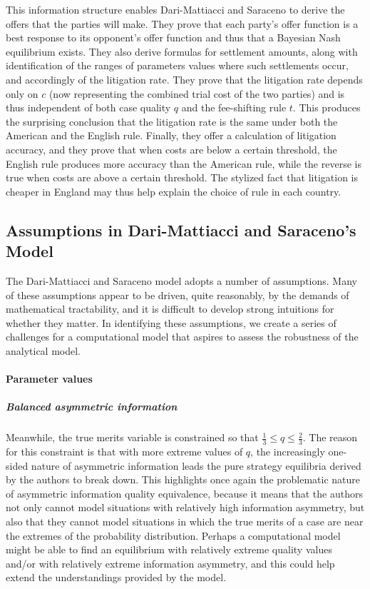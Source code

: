 \documentclass{article}
\begin{document}
This information structure enables Dari-Mattiacci and Saraceno to derive the offers that the parties will make. They prove that each party's offer function is a best response to its opponent's offer function and thus that a Bayesian Nash equilibrium exists. They also derive formulas for settlement amounts, along with identification of the ranges of parameters values where such settlements occur, and accordingly of the litigation rate. They prove that the litigation rate depends only on $c$ (now representing the combined trial cost of the two parties) and is thus independent of both case quality $q$ and the fee-shifting rule $t$. This produces the surprising conclusion that the litigation rate is the same under both the American and the English rule. Finally, they offer a calculation of litigation accuracy, and they prove that when costs are below a certain threshold, the English rule produces more accuracy than the American rule, while the reverse is true when costs are above a certain threshold. The stylized fact that litigation is cheaper in England may thus help explain the choice of rule in each country.

\subsection{Assumptions in Dari-Mattiacci and Saraceno's Model}\label{subsection:Assumptions}

The Dari-Mattiacci and Saraceno model adopts a number of assumptions. Many of these assumptions appear to be driven, quite reasonably, by the demands of mathematical tractability, and it is difficult to develop strong intuitions for whether they matter. In identifying these assumptions, we create a series of challenges for a computational model that aspires to assess the robustness of the analytical model.

\paragraph{Parameter values}
\subparagraph{Balanced asymmetric information}Meanwhile, the true merits variable is constrained so that $\frac{1}{3} \leq q \leq \frac{2}{3}$. The reason for this constraint is that with more extreme values of $q$, the increasingly one-sided nature of asymmetric information leads the pure strategy equilibria derived by the authors to break down. This highlights once again the problematic nature of asymmetric information quality equivalence, because it means that the authors not only cannot model situations with relatively high information asymmetry, but also that they cannot model situations in which the true merits of a case are near the extremes of the probability distribution. Perhaps a computational model might be able to find an equilibrium with relatively extreme quality values and/or with relatively extreme information asymmetry, and this could help extend the understandings provided by the model.
\end{document}
